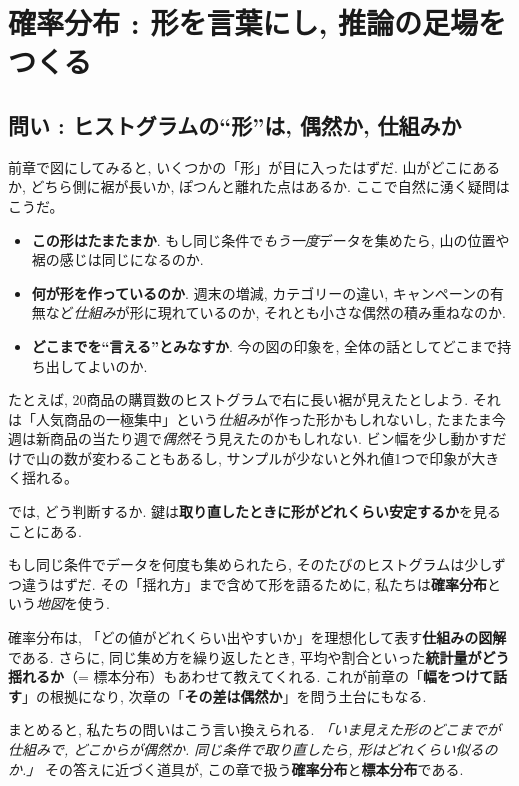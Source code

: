 \section{確率分布 : 形を言葉にし, 推論の足場をつくる}

  \subsection{問い : ヒストグラムの“形”は, 偶然か, 仕組みか}
    前章で図にしてみると, いくつかの「形」が目に入ったはずだ.  
    山がどこにあるか, どちら側に裾が長いか, ぽつんと離れた点はあるか.  
    ここで自然に湧く疑問はこうだ。

    \begin{itemize}
      \item \textbf{この形はたまたまか}. もし同じ条件で\textit{もう一度}データを集めたら, 山の位置や裾の感じは同じになるのか.
      \item \textbf{何が形を作っているのか}. 週末の増減, カテゴリーの違い, キャンペーンの有無など\textit{仕組み}が形に現れているのか, それとも小さな偶然の積み重ねなのか.
      \item \textbf{どこまでを“言える”とみなすか}. 今の図の印象を, 全体の話としてどこまで持ち出してよいのか.
    \end{itemize}

    たとえば, 20商品の購買数のヒストグラムで右に長い裾が見えたとしよう.  
    それは「人気商品の一極集中」という\textit{仕組み}が作った形かもしれないし, たまたま今週は新商品の当たり週で\textit{偶然}そう見えたのかもしれない.  
    ビン幅を少し動かすだけで山の数が変わることもあるし, サンプルが少ないと外れ値1つで印象が大きく揺れる。

    では, どう判断するか. 鍵は\textbf{取り直したときに形がどれくらい安定するか}を見ることにある.
  
    もし同じ条件でデータを何度も集められたら, そのたびのヒストグラムは少しずつ違うはずだ.  
    その「揺れ方」まで含めて形を語るために, 私たちは\textbf{確率分布}という\textit{地図}を使う.

    確率分布は, 「どの値がどれくらい出やすいか」を理想化して表す\textbf{仕組みの図解}である.  
    さらに, 同じ集め方を繰り返したとき, 平均や割合といった\textbf{統計量がどう揺れるか}（= 標本分布）もあわせて教えてくれる.  
    これが前章の「\textbf{幅をつけて話す}」の根拠になり, 次章の「\textbf{その差は偶然か}」を問う土台にもなる.

    まとめると, 私たちの問いはこう言い換えられる.
    \textit{「いま見えた形のどこまでが仕組みで, どこからが偶然か. 同じ条件で取り直したら, 形はどれくらい似るのか.」}  
    その答えに近づく道具が, この章で扱う\textbf{確率分布}と\textbf{標本分布}である.

